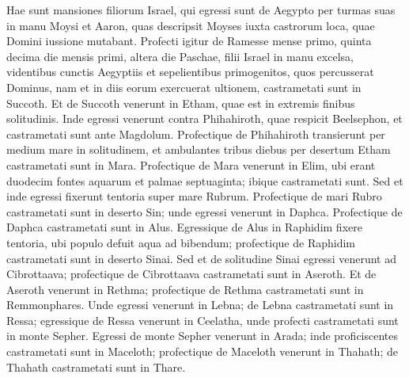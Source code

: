 \begin{biblechapter}
\begin{biblechapter}
\begin{biblechapter}
\begin{biblechapter}
\begin{biblechapter}
\begin{biblechapter}
\begin{biblechapter}
\begin{biblechapter}
\begin{biblechapter}
\begin{biblechapter}
\begin{biblechapter}
\begin{biblechapter}
\begin{biblechapter}
\begin{biblechapter}
\begin{biblechapter}
\begin{biblechapter}
\begin{biblechapter}
\begin{biblechapter}
\begin{biblechapter}
\begin{biblechapter}
\begin{biblechapter}
\begin{biblechapter}
\begin{biblechapter}
\begin{biblechapter}
\begin{biblechapter}
\begin{biblechapter}
\begin{biblechapter}
\begin{biblechapter}
\begin{biblechapter}
\begin{biblechapter}
\begin{biblechapter}
\begin{biblechapter}
\begin{biblechapter}
\verse Hae sunt mansiones filiorum Israel, qui egressi sunt de Aegypto per turmas suas in manu Moysi et Aaron, 
\verse quas descripsit Moyses iuxta castrorum loca, quae Domini iussione mutabant.
 \verse Profecti igitur de Ramesse mense primo, quinta decima die mensis primi, altera die Paschae, filii Israel in manu excelsa, videntibus cunctis Aegyptiis 
\verse et sepelientibus primogenitos, quos percusserat Dominus, nam et in diis eorum exercuerat ultionem, 
\verse castrametati sunt in Succoth. 
\verse Et de Succoth venerunt in Etham, quae est in extremis finibus solitudinis. 
\verse Inde egressi venerunt contra Phihahiroth, quae respicit Beelsephon, et castrametati sunt ante Magdolum. 
\verse Profectique de Phihahiroth transierunt per medium mare in solitudinem, et ambulantes tribus diebus per desertum Etham castrametati sunt in Mara. 
\verse Profectique de Mara venerunt in Elim, ubi erant duodecim fontes aquarum et palmae septuaginta; ibique castrametati sunt. 
\verse Sed et inde egressi fixerunt tentoria super mare Rubrum. Profectique de mari Rubro 
\verse castrametati sunt in deserto Sin; 
\verse unde egressi venerunt in Daphca. 
\verse Profectique de Daphca castrametati sunt in Alus. 
\verse Egressique de Alus in Raphidim fixere tentoria, ubi populo defuit aqua ad bibendum; 
\verse profectique de Raphidim castrametati sunt in deserto Sinai.
 \verse Sed et de solitudine Sinai egressi venerunt ad Cibrottaava; 
\verse profectique de Cibrottaava castrametati sunt in Aseroth. 
\verse Et de Aseroth venerunt in Rethma; 
\verse profectique de Rethma castrametati sunt in Remmonphares. 
\verse Unde egressi venerunt in Lebna; 
\verse de Lebna castrametati sunt in Ressa; 
\verse egressique de Ressa venerunt in Ceelatha, 
\verse unde profecti castrametati sunt in monte Sepher. 
\verse Egressi de monte Sepher venerunt in Arada; 
\verse inde proficiscentes castrametati sunt in Maceloth; 
\verse profectique de Maceloth venerunt in Thahath; 
\verse de Thahath castrametati sunt in Thare. 

\end{biblechapter}
\end{biblechapter}
\end{biblechapter}
\end{biblechapter}
\end{biblechapter}
\end{biblechapter}
\end{biblechapter}
\end{biblechapter}
\end{biblechapter}
\end{biblechapter}
\end{biblechapter}
\end{biblechapter}
\end{biblechapter}
\end{biblechapter}
\end{biblechapter}
\end{biblechapter}
\end{biblechapter}
\end{biblechapter}
\end{biblechapter}
\end{biblechapter}
\end{biblechapter}
\end{biblechapter}
\end{biblechapter}
\end{biblechapter}
\end{biblechapter}
\end{biblechapter}
\end{biblechapter}
\end{biblechapter}
\end{biblechapter}
\end{biblechapter}
\end{biblechapter}
\end{biblechapter}
\end{biblechapter}
